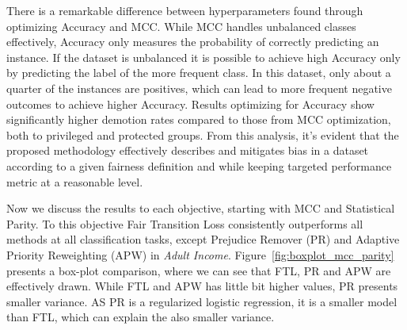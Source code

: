 There is a remarkable difference between hyperparameters found through optimizing Accuracy and MCC. While MCC handles unbalanced classes effectively, Accuracy only measures the probability of correctly predicting an instance. If the dataset is unbalanced it is possible to achieve high Accuracy only by predicting the label of the more frequent class. In this dataset, only about a quarter of the instances are positives, which can lead to more frequent negative outcomes to achieve higher Accuracy. Results optimizing for Accuracy show significantly higher demotion rates compared to those from MCC optimization, both to privileged and protected groups. From this analysis, it's evident that the proposed methodology effectively describes and mitigates bias in a dataset according to a given fairness definition and while keeping targeted performance metric at a reasonable level.

Now we discuss the results to each objective, starting with MCC and Statistical Parity. To this objective Fair Transition Loss consistently outperforms all methods at all classification tasks, except Prejudice Remover (PR) and Adaptive Priority Reweighting (APW) in \textit{Adult Income}. Figure~\ref{fig:boxplot_mcc_parity} presents a box-plot comparison, where we can see that FTL, PR and APW are effectively drawn. While FTL and APW has little bit higher values, PR presents smaller variance. AS PR is a regularized logistic regression, it is a smaller model than FTL, which can explain the also smaller variance. 

